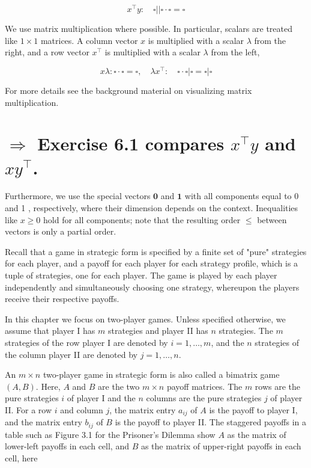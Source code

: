 \documentclass[12pt]{article}
\begin{document}
\begin{equation*}
x^{\top} y: \quad \square| | \square \cdot \square=\square \tag{6.2}
\end{equation*}


We use matrix multiplication where possible. In particular, scalars are treated like $1 \times 1$ matrices. A column vector $x$ is multiplied with a scalar $\lambda$ from the right, and a row vector $x^{\top}$ is multiplied with a scalar $\lambda$ from the left,


\begin{equation*}
x \lambda: \square \cdot \square=\square, \quad \lambda x^{\top}: \quad \square \cdot \square|\square=\square| \square \tag{6.3}
\end{equation*}


For more details see the background material on visualizing matrix multiplication.

\section*{$\Rightarrow$ Exercise 6.1 compares $x^{\top} y$ and $x y^{\top}$.}
Furthermore, we use the special vectors $\mathbf{0}$ and $\mathbf{1}$ with all components equal to 0 and 1 , respectively, where their dimension depends on the context. Inequalities like $x \geq 0$ hold for all components; note that the resulting order $\leq$ between vectors is only a partial order.

Recall that a game in strategic form is specified by a finite set of "pure" strategies for each player, and a payoff for each player for each strategy profile, which is a tuple of strategies, one for each player. The game is played by each player independently and simultaneously choosing one strategy, whereupon the players receive their respective payoffs.

In this chapter we focus on two-player games. Unless specified otherwise, we assume that player I has $m$ strategies and player II has $n$ strategies. The $m$ strategies of the row player I are denoted by $i=1, \ldots, m$, and the $n$ strategies of the column player II are denoted by $j=1, \ldots, n$.

An $m \times n$ two-player game in strategic form is also called a bimatrix game $(A, B)$. Here, $A$ and $B$ are the two $m \times n$ payoff matrices. The $m$ rows are the pure strategies $i$ of player I and the $n$ columns are the pure strategies $j$ of player II. For a row $i$ and column $j$, the matrix entry $a_{i j}$ of $A$ is the payoff to player I, and the matrix entry $b_{i j}$ of $B$ is the payoff to player II. The staggered payoffs in a table such as Figure 3.1 for the Prisoner's Dilemma show $A$ as the matrix of lower-left payoffs in each cell, and $B$ as the matrix of upper-right payoffs in each cell, here
\end{document}
